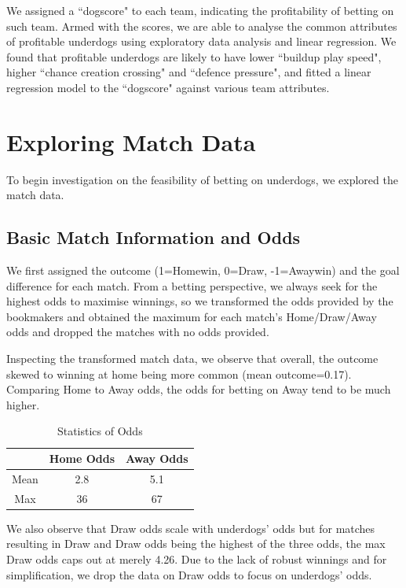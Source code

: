 \documentclass[12pt, a4paper]{article}
\begin{document}
We assigned a ``dogscore" to each team, indicating the profitability of betting on such team. Armed with the scores, we are able to analyse the common attributes of profitable underdogs using exploratory data analysis and linear regression. We found that profitable underdogs are likely to have lower ``buildup play speed", higher ``chance creation crossing" and ``defence pressure", and fitted a linear regression model to the ``dogscore" against various team attributes.

\section{Exploring Match Data}
To begin investigation on the feasibility of betting on underdogs, we explored the match data. 
\subsection{Basic Match Information and Odds}
We first assigned the outcome (1=Homewin, 0=Draw, -1=Awaywin) and the goal difference for each match. From a betting perspective, we always seek for the highest odds to maximise winnings, so we transformed the odds provided by the bookmakers and obtained the maximum for each match’s Home/Draw/Away odds and dropped the matches with no odds provided. 

Inspecting the transformed match data, we observe that overall, the outcome skewed to winning at home being more common (mean outcome=0.17). Comparing Home to Away odds, the odds for betting on Away tend to be much higher.

\begin{table}[!ht]
    \centering
    \begin{tabular}{|c|c|c|}
    \hline & Home Odds & Away Odds \\
    \hline Mean & 2.8 & 5.1 \\
    \hline Max & 36 & 67 \\
    \hline

    \end{tabular}
    \caption{Statistics of Odds}
    \label{tab:my_label}
\end{table}

We also observe that Draw odds scale with underdogs’ odds but for matches resulting in Draw and Draw odds being the highest of the three odds, the max Draw odds caps out at merely 4.26. Due to the lack of robust winnings and for simplification, we drop the data on Draw odds to focus on underdogs’ odds. 
\end{document}

